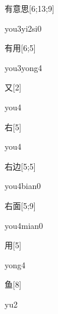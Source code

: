 \begin{verbete}[you3yi2si0]{有意思}[6;13;9]
\begin{pronuncia}{you3yi2si0}
\end{pronuncia}
\end{verbete}

\begin{verbete}{有用}[6;5]
\begin{pronuncia}{you3yong4}
\end{pronuncia}
\end{verbete}

\begin{verbete}[you4]{又}[2]
\begin{pronuncia}{you4}
\end{pronuncia}
\end{verbete}

\begin{verbete}[you4]{右}[5]
\begin{pronuncia}{you4}
\end{pronuncia}
\end{verbete}

\begin{verbete}{右边}[5;5]
\begin{pronuncia}{you4bian0}
\end{pronuncia}
\end{verbete}

\begin{verbete}{右面}[5;9]
\begin{pronuncia}{you4mian0}
\end{pronuncia}
\end{verbete}

\begin{verbete}[yong4]{用}[5]
\begin{pronuncia}{yong4}
\end{pronuncia}
\end{verbete}

\begin{verbete}[yu2]{鱼}[8]
\begin{pronuncia}{yu2}
\end{pronuncia}
\end{verbete}

